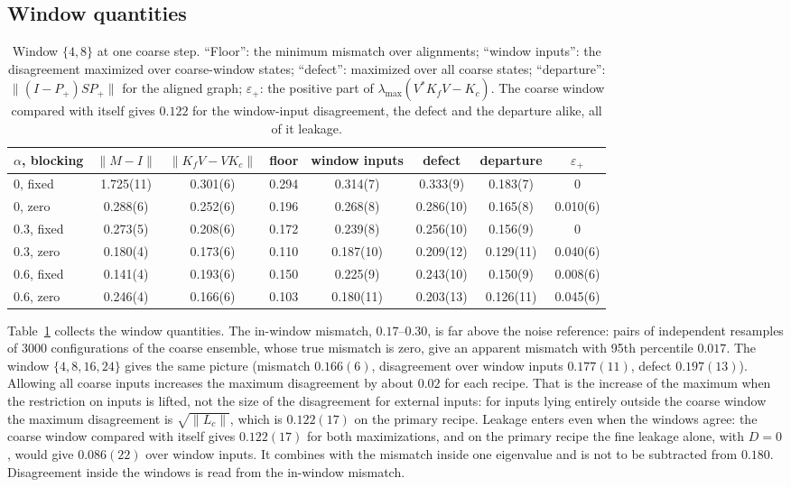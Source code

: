 \documentclass[11pt]{article}
\newcommand{\eps}{\varepsilon}
\newcommand{\lmax}{\lambda_{\max}}
\begin{document}
\subsection{Window quantities}

\begin{table}[t]
\centering
\small\setlength{\tabcolsep}{4.5pt}
\begin{tabular}{@{}lccccccc@{}}
\toprule
$\alpha$, blocking & $\|M-I\|$ & $\|K_fV-VK_c\|$ & floor & window inputs & defect & departure & $\eps_+$ \\
\midrule
0, fixed & 1.725(11) & 0.301(6) & 0.294 & 0.314(7) & 0.333(9) & 0.183(7) & 0 \\
0, zero & 0.288(6) & 0.252(6) & 0.196 & 0.268(8) & 0.286(10) & 0.165(8) & 0.010(6) \\
0.3, fixed & 0.273(5) & 0.208(6) & 0.172 & 0.239(8) & 0.256(10) & 0.156(9) & 0 \\
0.3, zero & 0.180(4) & 0.173(6) & 0.110 & 0.187(10) & 0.209(12) & 0.129(11) & 0.040(6) \\
0.6, fixed & 0.141(4) & 0.193(6) & 0.150 & 0.225(9) & 0.243(10) & 0.150(9) & 0.008(6) \\
0.6, zero & 0.246(4) & 0.166(6) & 0.103 & 0.180(11) & 0.203(13) & 0.126(11) & 0.045(6) \\
\bottomrule
\end{tabular}
\caption{Window $\{4,8\}$ at one coarse step. ``Floor'': the minimum mismatch over alignments;
``window inputs'': the disagreement maximized over coarse-window states; ``defect'': maximized over all
coarse states; ``departure'': $\|(I-P_+)SP_+\|$ for the aligned graph; $\eps_+$: the positive part of
$\lmax(V^*K_fV-K_c)$. The coarse window compared with itself gives $0.122$ for the window-input disagreement, the defect
and the departure alike, all of it leakage.}
\label{tab:window}
\end{table}

Table~\ref{tab:window} collects the window quantities. The in-window mismatch, $0.17$--$0.30$, is far
above the noise reference: pairs of independent resamples of 3000 configurations of the coarse ensemble,
whose true mismatch is zero, give an apparent mismatch with 95th percentile $0.017$. The window
$\{4,8,16,24\}$ gives the same picture (mismatch $0.166(6)$, disagreement over window inputs $0.177(11)$,
defect $0.197(13)$). Allowing all coarse inputs increases the maximum disagreement by about $0.02$ for
each recipe. That is the increase of the maximum when the restriction on inputs is lifted, not the size
of the disagreement for external inputs: for inputs lying entirely outside the coarse window the maximum
disagreement is $\sqrt{\|L_c\|}$, which is $0.122(17)$ on the primary recipe. Leakage enters even when
the windows agree: the coarse window compared with itself gives $0.122(17)$ for both maximizations, and on
the primary recipe the fine leakage alone, with $D=0$, would give $0.086(22)$ over window inputs. It
combines with the mismatch inside one eigenvalue and is not to be subtracted from $0.180$.
Disagreement inside the windows is read from the in-window mismatch.
\end{document}
